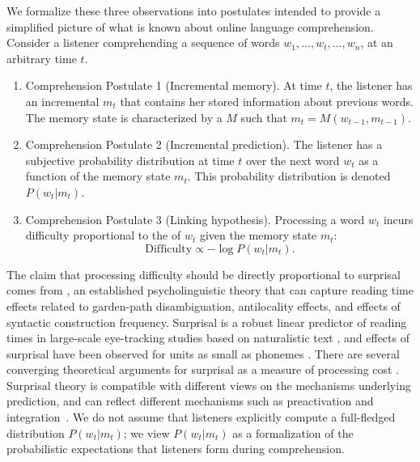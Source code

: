 We formalize these three observations into postulates intended to provide a simplified picture of what is known about online language comprehension. Consider a listener comprehending a sequence of words $w_1, \dots, w_t, \dots, w_n$, at an arbitrary time $t$.
\begin{enumerate}
    \item Comprehension Postulate 1 (Incremental memory). At time $t$, the listener has an incremental  $m_t$ that contains her stored information about previous words. The memory state is characterized by a  $M$ such that $m_t = M(w_{t-1}, m_{t-1})$.
    \item Comprehension Postulate 2 (Incremental prediction). The listener has a subjective probability distribution at time $t$ over the next word $w_t$ as a function of the memory state $m_t$. This probability distribution is denoted $P(w_t|m_t)$.
    \item Comprehension Postulate 3 (Linking hypothesis). Processing a word $w_t$ incurs difficulty proportional to the  of $w_t$ given the memory state $m_t$:
    \begin{equation}
    \label{eq:lossy-surp}
    \text{Difficulty} \propto -\log P(w_t | m_t).
\end{equation}
\end{enumerate}
The claim that processing difficulty should be directly proportional to surprisal comes from  \citep{hale2001probabilistic,levy2008expectation}, an established psycholinguistic theory that can capture reading time effects related to garden-path disambiguation, antilocality effects, and effects of syntactic construction frequency. Surprisal is a robust linear predictor of reading times in large-scale eye-tracking studies based on naturalistic text \citep{smith2013effect,goodkind-predictive-2018,aurnhammer2019evaluating,wilcox2020predictive}, and effects of surprisal have been observed for units as small as phonemes \citep{gwilliams2020neural}. There are several converging theoretical arguments for surprisal as a measure of processing cost \citep{levy2008expectation,smith2013effect}.
Surprisal theory is compatible with different views on the mechanisms underlying prediction, and can reflect different mechanisms such as preactivation and integration~\citep{kuperberg2016we}.
We do not assume that listeners explicitly compute a full-fledged distribution $P(w_t|m_t)$; we view $P(w_t|m_t)$ as a formalization of the probabilistic expectations that listeners form during comprehension.

